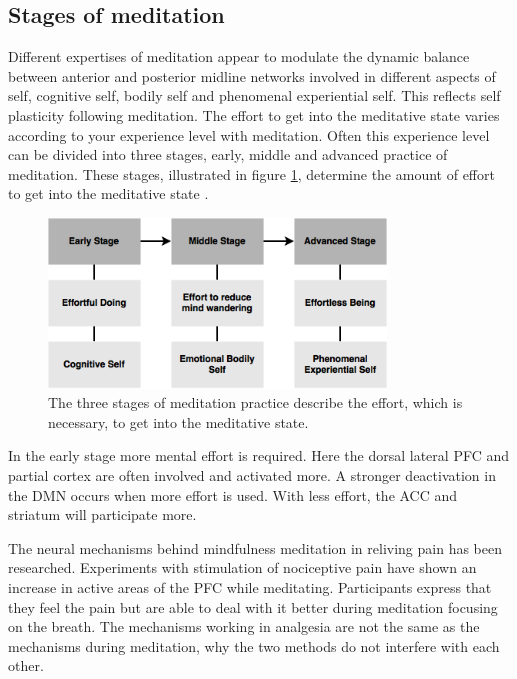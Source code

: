 \subsection{Stages of meditation}
Different expertises of meditation appear to modulate the dynamic balance between anterior and posterior midline networks involved in different aspects of self, cognitive self, bodily self and phenomenal experiential self. This reflects self plasticity following meditation. 
The effort to get into the meditative state varies according to your experience level with meditation. Often this experience level can be divided into three stages, early, middle and advanced practice of meditation. These stages, illustrated in figure \ref{fig:meditation_stages}, determine the amount of effort to get into the meditative state \cite{Tang2017}. 

\begin{figure}[H]
\includegraphics[width=0.8\textwidth]{figures/stages_of_meditation.png} 
	\caption{The three stages of meditation practice describe the effort, which is necessary, to get into the meditative state. \cite{Tang2017}}
	\label{fig:meditation_stages}  
\end{figure}  

In the early stage more mental effort is required. Here the dorsal lateral PFC and partial cortex are often involved and activated more. A stronger deactivation in the DMN occurs when more effort is used. With less effort, the ACC and striatum will participate more. \cite{Tang2017}

The neural mechanisms behind mindfulness meditation in reliving pain has been researched. Experiments with stimulation of nociceptive pain have shown an increase in active areas of the PFC while meditating. Participants express that they feel the pain but are able to deal with it better during meditation focusing on the breath. 
The mechanisms working in analgesia are not the same as the mechanisms during meditation, why the two methods do not interfere with each other. \cite{Jacob2016}

